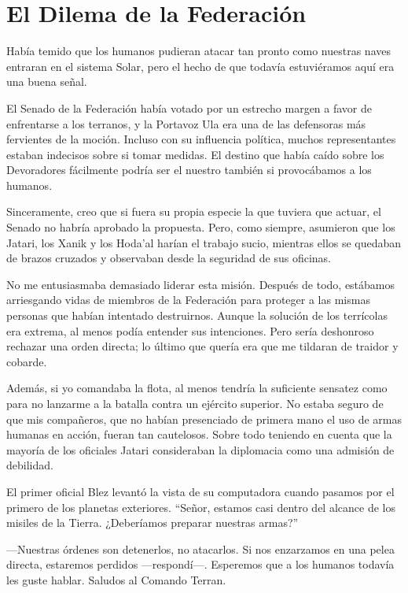 \chapter{El Dilema de la Federación}\label{sec:el-dilema-de-la-federacion}

Había temido que los humanos pudieran atacar tan pronto como nuestras naves entraran en el sistema Solar, pero el hecho de que todavía estuviéramos aquí era una buena señal.

El Senado de la Federación había votado por un estrecho margen a favor de enfrentarse a los terranos, y la Portavoz Ula era una de las defensoras más fervientes de la moción. Incluso con su influencia política, muchos representantes estaban indecisos sobre si tomar medidas. El destino que había caído sobre los Devoradores fácilmente podría ser el nuestro también si provocábamos a los humanos.

Sinceramente, creo que si fuera su propia especie la que tuviera que actuar, el Senado no habría aprobado la propuesta. Pero, como siempre, asumieron que los Jatari, los Xanik y los Hoda'al harían el trabajo sucio, mientras ellos se quedaban de brazos cruzados y observaban desde la seguridad de sus oficinas.

No me entusiasmaba demasiado liderar esta misión. Después de todo, estábamos arriesgando vidas de miembros de la Federación para proteger a las mismas personas que habían intentado destruirnos. Aunque la solución de los terrícolas era extrema, al menos podía entender sus intenciones. Pero sería deshonroso rechazar una orden directa; lo último que quería era que me tildaran de traidor y cobarde.

Además, si yo comandaba la flota, al menos tendría la suficiente sensatez como para no lanzarme a la batalla contra un ejército superior. No estaba seguro de que mis compañeros, que no habían presenciado de primera mano el uso de armas humanas en acción, fueran tan cautelosos. Sobre todo teniendo en cuenta que la mayoría de los oficiales Jatari consideraban la diplomacia como una admisión de debilidad.

El primer oficial Blez levantó la vista de su computadora cuando pasamos por el primero de los planetas exteriores. “Señor, estamos casi dentro del alcance de los misiles de la Tierra. ¿Deberíamos preparar nuestras armas?”

—Nuestras órdenes son detenerlos, no atacarlos. Si nos enzarzamos en una pelea directa, estaremos perdidos —respondí—. Esperemos que a los humanos todavía les guste hablar. Saludos al Comando Terran.

